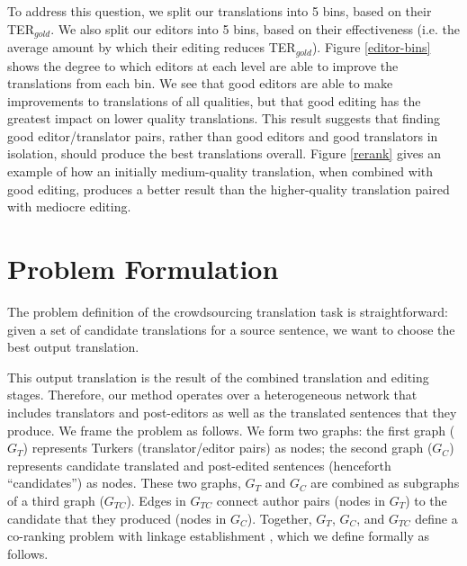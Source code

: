 \documentclass[11pt]{article}
\begin{document}
To address this question, we split our translations into 5 bins, based on their TER$_{gold}$.  We also split our editors into 5 bins, based on their effectiveness (i.e. the average amount by which their editing reduces TER$_{gold}$). Figure \ref{editor-bins} shows the degree to which editors at each level are able to improve the translations from each bin. We see that good editors are able to make improvements to translations of all qualities, but that good editing has the greatest impact on lower quality translations. This result suggests that finding good editor/translator pairs, rather than good editors and good translators in isolation, should produce the best translations overall. Figure \ref{rerank} gives an example of how an initially medium-quality translation, when combined with good editing, produces a better result than the higher-quality translation paired with mediocre editing.


\section{Problem Formulation}
The problem definition of the crowdsourcing translation task is straightforward: given a set of candidate translations for a source sentence, we want to choose the best output translation.

This output translation is the result of the combined translation and editing stages. Therefore, our method operates over a heterogeneous network that includes translators and post-editors as well as the translated sentences that they produce. We frame the problem as follows. We form two graphs: the first graph ($G_T$) represents Turkers (translator/editor pairs) as nodes; the second graph ($G_C$) represents candidate translated and post-edited sentences (henceforth ``candidates'') as nodes. These two graphs, $G_T$ and $G_C$ are combined as subgraphs of a third graph ($G_{TC}$). Edges in $G_{TC}$ connect author pairs (nodes in $G_T$) to the candidate that they produced (nodes in $G_C$). Together,  $G_T$, $G_C$, and $G_{TC}$ define a co-ranking problem \cite{a28,a99,a30} with linkage establishment \cite{a96,a95}, which we define formally as follows.
\end{document}
